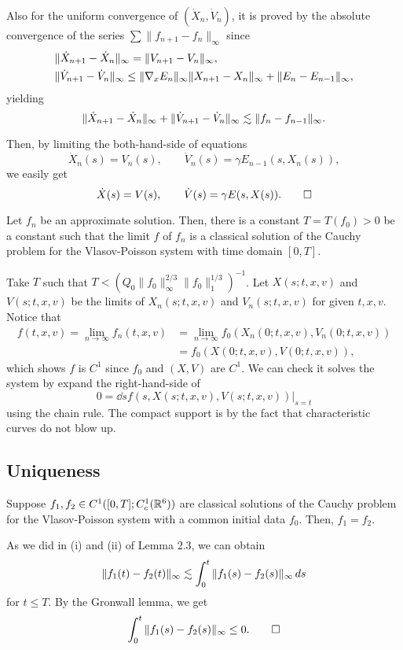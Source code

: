 \documentclass[11pt]{amsart}
\begin{document}
\begin{pf}
Also for the uniform convergence of $(\dot X_n,\dot V_n)$, it is proved by the absolute convergence of the series $\sum\|f_{n+1}-f_n\|_\infty$ since
\begin{align*}
&\|\dot X_{n+1}-\dot X_n\|_\infty=\|V_{n+1}-V_n\|_\infty,\\
&\|\dot V_{n+1}-\dot V_n\|_\infty\le\|\nabla_xE_n\|_\infty\|X_{n+1}-X_n\|_\infty+\|E_n-E_{n-1}\|_\infty,
\end{align*}
yielding
\[\|\dot X_{n+1}-\dot X_n\|_\infty+\|\dot V_{n+1}-\dot V_n\|_\infty\lesssim\|f_n-f_{n-1}\|_\infty.\]

Then, by limiting the both-hand-side of equations
\[\dot X_n(s)=V_n(s),\qquad \dot V_n(s)=\gamma E_{n-1}(s,X_n(s)),\]
we easily get
\[\dot X(s)=V(s),\qquad \dot V(s)=\gamma E(s,X(s)).\qedhere\]
\end{pf}

\begin{thm}
Let $f_n$ be an approximate solution.
Then, there is a constant $T=T(f_0)>0$ be a constant such that the limit $f$ of $f_n$ is a classical solution of the Cauchy problem for the Vlasov-Poisson system with time domain $[0,T]$.
\end{thm}
\begin{pf}
Take $T$ such that $T<(Q_0\|f_0\|_\infty^{2/3}\|f_0\|_1^{1/3})^{-1}$.
Let $X(s;t,x,v)$ and $V(s;t,x,v)$ be the limits of $X_n(s;t,x,v)$ and $V_n(s;t,x,v)$ for given $t,x,v$.
Notice that
\begin{align*}
f(t,x,v)=\lim_{n\to\infty}f_n(t,x,v)&=\lim_{n\to\infty}f_0(X_n(0;t,x,v),V_n(0;t,x,v))\\
&=f_0(X(0;t,x,v),V(0;t,x,v)),
\end{align*}
which shows $f$ is $C^1$ since $f_0$ and $(X,V)$ are $C^1$.
We can check it solves the system by expand the right-hand-side of
\[0=\dd{s}f(s,X(s;t,x,v),V(s;t,x,v))|_{s=t}\]
using the chain rule.
The compact support is by the fact that characteristic curves do not blow up.
\end{pf}


\subsection{Uniqueness}
\begin{thm}[Uniqueness]
Suppose $f_1,f_2\in C^1([0,T];C_c^1(\mathbb{R}^6))$ are classical solutions of the Cauchy problem for the Vlasov-Poisson system with a common initial data $f_0$.
Then, $f_1=f_2$.
\end{thm}
\begin{pf}
As we did in (i) and (ii) of Lemma 2.3, we can obtain
\[\|f_1(t)-f_2(t)\|_\infty\lesssim\int_0^t\|f_1(s)-f_2(s)\|_\infty\,ds\]
for $t\le T$.
By the Gronwall lemma, we get
\[\int_0^t\|f_1(s)-f_2(s)\|_\infty\le0.\qedhere\]
\end{pf}
\end{document}
